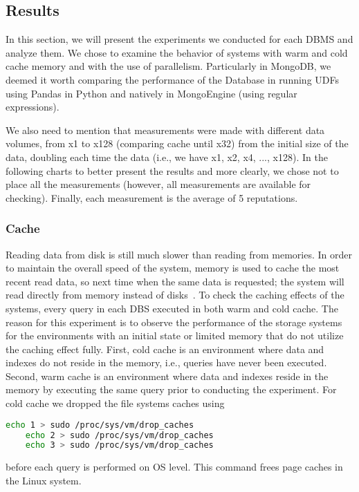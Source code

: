 \subsection{Results}

In this section, we will present the experiments we conducted for each DBMS and analyze them. 
We chose to examine the behavior of systems with warm and cold cache memory and with the use of parallelism. 
Particularly in MongoDB, we deemed it worth comparing the performance of the Database in running UDFs using 
Pandas in Python and natively in MongoEngine (using regular expressions).

We also need to mention that measurements were made with different data volumes, 
from x1 to x128 (comparing cache until x32) from the initial size of the data, 
doubling each time the data (i.e., we have x1, x2, x4, ..., x128). 
In the following charts to better present the results and more clearly, we chose not to place all the measurements 
(however, all measurements are available for checking). Finally, each measurement is the average of 5 reputations.

\subsubsection{Cache}
Reading data from disk is still much slower than reading from memories. In
order to maintain the overall speed of the system, memory is used to cache the most
recent read data, so next time when the same data is requested; the system will read
directly from memory instead of disks~\cite{Smit82}. 
To check the caching effects of the systems, every query in each DBS executed in both warm and cold cache. 
The reason for this experiment is to observe the performance of the storage systems for the environments 
with an initial state or limited memory that do not utilize the caching effect fully. 
First, cold cache is an environment where data and indexes do not reside in the memory, i.e., queries have
never been executed. 
Second, warm cache is an environment where data and indexes
reside in the memory by executing the same query prior to conducting the experiment. 
For cold cache we dropped the file systems caches using
\begin{lstlisting}[language=bash]
	echo 1 > sudo /proc/sys/vm/drop_caches
	echo 2 > sudo /proc/sys/vm/drop_caches
	echo 3 > sudo /proc/sys/vm/drop_caches
\end{lstlisting} 
before each query is performed on OS level. 
This command frees page caches in the Linux system. 

